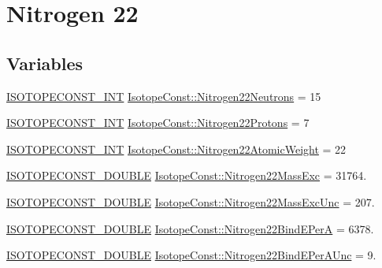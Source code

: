 \hypertarget{group___isotope_const-_nitrogen-_n22}{}\section{Nitrogen 22}
\label{group___isotope_const-_nitrogen-_n22}
\subsection*{Variables}
\begin{DoxyCompactItemize}
\item 
\mbox{\hyperlink{group___isotope_const-_macros_ga5f18360b3e99483a35c32d789e62621c}{I\+S\+O\+T\+O\+P\+E\+C\+O\+N\+S\+T\+\_\+\+I\+NT}} \mbox{\hyperlink{group___isotope_const-_nitrogen-_n22_ga8da39a8ac6af648049b8f54997085759}{Isotope\+Const\+::\+Nitrogen22\+Neutrons}} = 15
\item 
\mbox{\hyperlink{group___isotope_const-_macros_ga5f18360b3e99483a35c32d789e62621c}{I\+S\+O\+T\+O\+P\+E\+C\+O\+N\+S\+T\+\_\+\+I\+NT}} \mbox{\hyperlink{group___isotope_const-_nitrogen-_n22_ga45dbd5455db10b27267fd703e4c8d866}{Isotope\+Const\+::\+Nitrogen22\+Protons}} = 7
\item 
\mbox{\hyperlink{group___isotope_const-_macros_ga5f18360b3e99483a35c32d789e62621c}{I\+S\+O\+T\+O\+P\+E\+C\+O\+N\+S\+T\+\_\+\+I\+NT}} \mbox{\hyperlink{group___isotope_const-_nitrogen-_n22_ga77102ea5ce51e5b82e513319731e4d54}{Isotope\+Const\+::\+Nitrogen22\+Atomic\+Weight}} = 22
\item 
\mbox{\hyperlink{group___isotope_const-_macros_ga8f45a7272ce02c0b4c65c44636ed719a}{I\+S\+O\+T\+O\+P\+E\+C\+O\+N\+S\+T\+\_\+\+D\+O\+U\+B\+LE}} \mbox{\hyperlink{group___isotope_const-_nitrogen-_n22_gad9d8baff76ca434e03ee18fba6dd92f5}{Isotope\+Const\+::\+Nitrogen22\+Mass\+Exc}} = 31764.
\item 
\mbox{\hyperlink{group___isotope_const-_macros_ga8f45a7272ce02c0b4c65c44636ed719a}{I\+S\+O\+T\+O\+P\+E\+C\+O\+N\+S\+T\+\_\+\+D\+O\+U\+B\+LE}} \mbox{\hyperlink{group___isotope_const-_nitrogen-_n22_ga4c931f248d4291490c8afb21b3e5fef2}{Isotope\+Const\+::\+Nitrogen22\+Mass\+Exc\+Unc}} = 207.
\item 
\mbox{\hyperlink{group___isotope_const-_macros_ga8f45a7272ce02c0b4c65c44636ed719a}{I\+S\+O\+T\+O\+P\+E\+C\+O\+N\+S\+T\+\_\+\+D\+O\+U\+B\+LE}} \mbox{\hyperlink{group___isotope_const-_nitrogen-_n22_ga5b26644c4e1358dde2a237a975e6c043}{Isotope\+Const\+::\+Nitrogen22\+Bind\+E\+PerA}} = 6378.
\item 
\mbox{\hyperlink{group___isotope_const-_macros_ga8f45a7272ce02c0b4c65c44636ed719a}{I\+S\+O\+T\+O\+P\+E\+C\+O\+N\+S\+T\+\_\+\+D\+O\+U\+B\+LE}} \mbox{\hyperlink{group___isotope_const-_nitrogen-_n22_gaa791fcdc50985604e91845bb65e93c1f}{Isotope\+Const\+::\+Nitrogen22\+Bind\+E\+Per\+A\+Unc}} = 9.

\end{DoxyCompactItemize}
